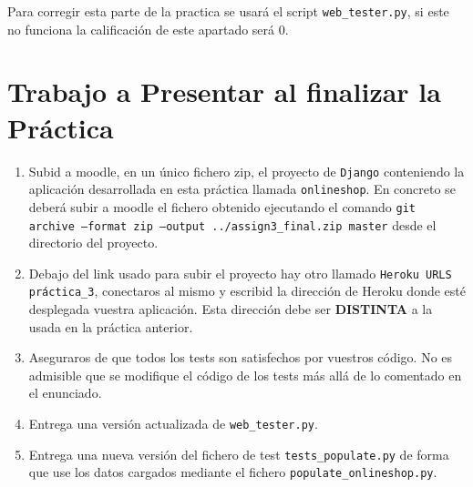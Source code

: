 \documentclass[12pt]{article} %
\newcommand{\ttt}[1]{\texttt{#1}}%
\newcommand{\django}{\texttt{Django}}%
\begin{document}
Para corregir esta parte de la practica se usará el script \ttt{web\_tester.py}, si este no funciona la calificación de este apartado será 0. 


%

\section{Trabajo a Presentar al finalizar  la Práctica} %


\begin{minipage}{\linewidth}
\begin{framed}
\begin{enumerate}

\item Subid a moodle, en un único fichero zip, el proyecto de \django{} conteniendo la aplicación desarrollada en esta práctica llamada \texttt{onlineshop}. En concreto se deberá subir a moodle el fichero obtenido ejecutando el comando \texttt{git archive --format zip --output ../assign3\_final.zip  master} desde el directorio del proyecto.

\item Debajo del link usado para subir el proyecto hay otro llamado \texttt{Heroku URLS práctica\_3}, conectaros al mismo y escribid la dirección de Heroku donde esté desplegada vuestra aplicación. Esta dirección debe ser \textbf{DISTINTA} a la usada en la práctica anterior.

\item  Aseguraros de que todos los tests  son satisfechos por vuestros código. No es admisible que se modifique el código de los tests más allá de lo comentado en el enunciado.

\item Entrega una versión actualizada de \ttt{web\_tester.py}.

\item Entrega una nueva versión del fichero de test \texttt{tests\_populate.py} de forma que use los datos cargados mediante el fichero \texttt{populate\_onlineshop.py}. 

\end{enumerate}
\end{framed}
\end{minipage}\\\\
\end{document}
